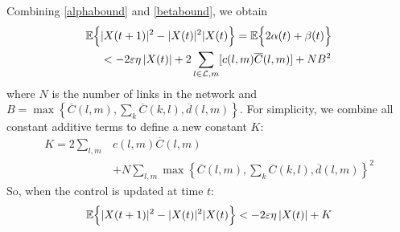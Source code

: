 Combining \eqref{alphabound} and \eqref{betabound}, we obtain
\begin{align}
\mathbb{E}\Big\{ &|X(t+1)|^{2} - |X(t)|^{2}  |   X(t) \Big\} = \mathbb{E}\Big\{ 2\alpha(t) + \beta(t) \Big\} \nonumber \\
&<  -2\varepsilon \eta \left| X(t ) \right| + 2 \sum_{l \in \mathcal{L},m} [c(l,m)\overline{C} (l,m) ]+ NB^{2}
\end{align}
where $N$ is the number of links in the network and $B=\max\left\{ \overline{C}(l,m), \sum_{k} \overline{C}(k,l),  \overline d (l,m) \right\}$. 
For simplicity, we combine all constant additive terms to define a new constant $K$:
\begin{align}\label{constCalc}
K = 2 \displaystyle\sum_{l,m} & c(l,m) \overline{C}(l,m) \\
\nonumber & + N \displaystyle\sum_{l,m} \max\left\{ \overline{C}(l,m), \sum_{k} \overline{C}(k,l),  \overline d (l,m) \right\}^2
\end{align}
So, when the control is updated at time $t$:
\begin{equation}\label{stabBasic}
\expectation{|X(t+1)|^{2} - |X(t)|^{2}  |   X(t)} < -2\varepsilon \eta \left| X(t ) \right| + K
\end{equation}









